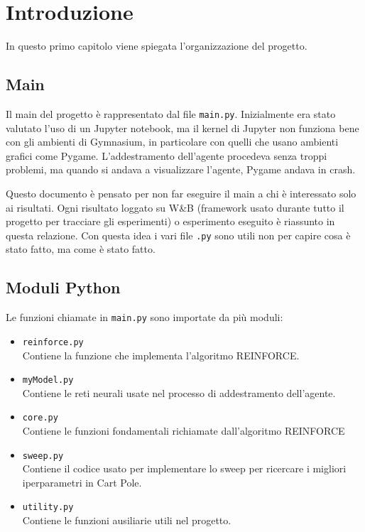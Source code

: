 \chapter{Introduzione}
In questo primo capitolo viene spiegata l’organizzazione del progetto.

\section{Main}
Il main del progetto è rappresentato dal file \texttt{main.py}. Inizialmente era stato valutato l'uso di un Jupyter notebook, ma il kernel di Jupyter non funziona bene con gli ambienti di Gymnasium, in particolare con quelli che usano ambienti grafici come Pygame. L'addestramento dell'agente procedeva senza troppi problemi, ma quando si andava a visualizzare l'agente, Pygame andava in crash.

\myskip

Questo documento è pensato per non far eseguire il main a chi è interessato solo ai risultati. Ogni risultato loggato su W\&B \cite{wandb} (framework usato durante tutto il progetto per tracciare gli esperimenti) o esperimento eseguito è riassunto in questa relazione. Con questa idea i vari file \texttt{.py} sono utili non per capire cosa è stato fatto, ma come è stato fatto.

\section{Moduli Python}
Le funzioni chiamate in \texttt{main.py} sono importate da più moduli:
\begin{itemize}
    \item \texttt{reinforce.py} \\
        Contiene la funzione che implementa l'algoritmo REINFORCE.
    \item \texttt{myModel.py} \\
        Contiene le reti neurali usate nel processo di addestramento dell'agente.
    \item \texttt{core.py} \\
        Contiene le funzioni fondamentali richiamate dall'algoritmo REINFORCE
    \item \texttt{sweep.py} \\
        Contiene il codice usato per implementare lo sweep per ricercare i migliori iperparametri in Cart Pole.
    \item \texttt{utility.py} \\
        Contiene le funzioni ausiliarie utili nel progetto.
\end{itemize}